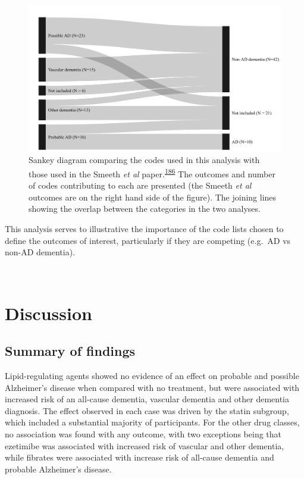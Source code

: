 \documentclass[a4paper, twoside]{templates/ociamthesis}
\begin{document}
~





\begin{figure}[H]
\includegraphics[width=1\linewidth]{figures/cprd-analysis/sankey_diagram} \caption[Comparison of code used in this analysis with those used in the Smeeth et al.~2010 paper]{Sankey diagram comparing the codes used in this analysis with those used in the Smeeth \emph{et al} paper.\textsuperscript{\protect\hyperlink{ref-smeeth2009}{186}} The outcomes and number of codes contributing to each are presented (the Smeeth \emph{et al} outcomes are on the right hand side of the figure). The joining lines showing the overlap between the categories in the two analyses.}\label{fig:smeethComparison}
\end{figure}

This analysis serves to illustrative the importance of the code lists chosen to define the outcomes of interest, particularly if they are competing (e.g.~AD vs non-AD dementia).

~

\hypertarget{discussion-2}{%
\section{Discussion}\label{discussion-2}}

\hypertarget{summary-of-findings-1}{%
\subsection{Summary of findings}\label{summary-of-findings-1}}

Lipid-regulating agents showed no evidence of an effect on probable and possible Alzheimer's disease when compared with no treatment, but were associated with increased risk of an all-cause dementia, vascular dementia and other dementia diagnosis. The effect observed in each case was driven by the statin subgroup, which included a substantial majority of participants. For the other drug classes, no association was found with any outcome, with two exceptions being that ezetimibe was associated with increased risk of vascular and other dementia, while fibrates were associated with increase risk of all-cause dementia and probable Alzheimer's disease.
\end{document}
